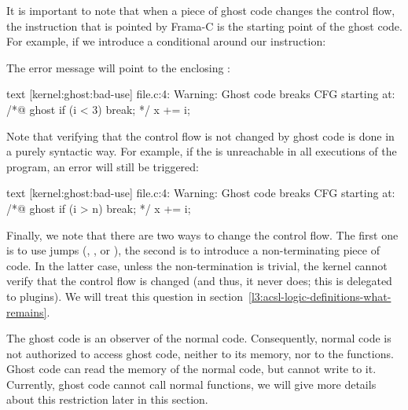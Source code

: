 It is important to note that when a piece of ghost code changes the control
flow, the instruction that is pointed by Frama-C is the starting
point of the ghost code. For example, if we introduce a conditional
around our  instruction:




The error message will point to the enclosing :


\begin{CodeBlock}{text}
[kernel:ghost:bad-use] file.c:4: Warning:
  Ghost code breaks CFG starting at:
  /*@ ghost if (i < 3) break; */
  x += i;
\end{CodeBlock}


Note that verifying that the control flow is not changed by ghost
code is done in a purely syntactic way. For example, if the
 is unreachable in all executions of the program,
an error will still be triggered:




\begin{CodeBlock}{text}
[kernel:ghost:bad-use] file.c:4: Warning:
  Ghost code breaks CFG starting at:
  /*@ ghost if (i > n) break; */
  x += i;
\end{CodeBlock}


Finally, we note that there are two ways to change the control
flow. The first one is to use jumps (,
, or ), the second is to
introduce a non-terminating piece of code. In the latter case, unless the non-termination
is trivial, the kernel cannot verify that the control
flow is changed (and thus, it never does; this is delegated to plugins).
We will treat this question in
section~\ref{l3:acsl-logic-definitions-what-remains}.




The ghost code is an observer of the normal code. Consequently, normal
code is not authorized to access ghost code, neither to its memory,
nor to the functions. Ghost code can read the memory of the normal code,
but cannot write to it. Currently, ghost code cannot call normal functions,
we will give more details about this restriction later in this section.


